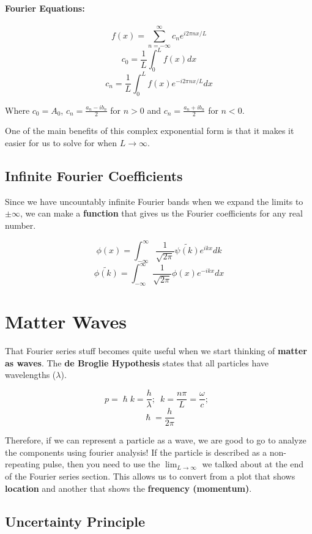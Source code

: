 \documentclass[a4paper,12pt]{report}
\begin{document}
\paragraph{Fourier Equations:}
$$f(x) = \sum_{n=-\infty}^{\infty} c_n e^{i2\pi n x / L} $$
$$c_0 = \frac{1}{L} \int_0^L f(x) dx$$
$$c_n = \frac{1}{L} \int_0^L f(x) e^{-i 2\pi n x /L}dx$$

Where $c_0 = A_0$, $c_n = \frac{a_n-ib_n}{2}$ for $n > 0$ and $c_n = \frac{a_n + ib_n}{2}$ for $n < 0$. 

One of the main benefits of this complex exponential form is that it makes it easier for us to solve for when $L \to \infty$.

\subsection{Infinite Fourier Coefficients}

Since we have uncountably infinite Fourier bands when we expand the limits to $\pm \infty$, we can make a \textbf{function} that gives us the Fourier coefficients for any real number. 

$$\phi(x) = \int_{-\infty}^{\infty} \frac{1}{\sqrt{2\pi}} \tilde{\psi(k)} e^{ikx} dk $$
$$\tilde{\phi(k)} = \int_{-\infty}^{\infty} \frac{1}{\sqrt{2\pi}} \phi(x) e^{-ikx} dx $$

\section{Matter Waves}

That Fourier series stuff becomes quite useful when we start thinking of \textbf{matter as waves}. The \textbf{de Broglie Hypothesis} states that all particles have wavelengths ($\lambda$). 

$$p = \hslash k = \frac{h}{\lambda}; \,\,\, k = \frac{n\pi}{L}=\frac{\omega}{c};\,\,\,$$
$$\hslash = \frac{h}{2\pi}$$

Therefore, if we can represent a particle as a wave, we are good to go to analyze the components using fourier analysis! If the particle is described as a non-repeating pulse, then you need to use the $\lim_{L\to\infty}$ we talked about at the end of the Fourier series section. This allows us to convert from a plot that shows \textbf{location} and another that shows the \textbf{frequency (momentum)}. 

\subsection{Uncertainty Principle}
\end{document}
